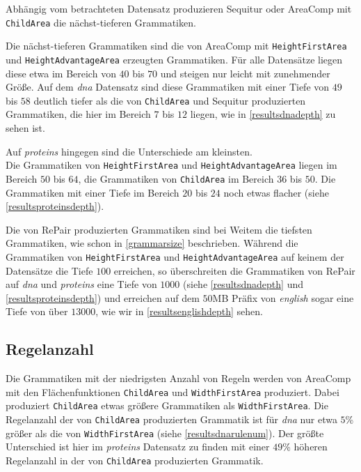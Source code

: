 Abhängig vom betrachteten Datensatz produzieren Sequitur oder AreaComp mit \\
\texttt{ChildArea} die nächst-tieferen Grammatiken. 

Die nächst-tieferen Grammatiken sind die von AreaComp mit 
\texttt{HeightFirstArea} und \texttt{HeightAdvantageArea} erzeugten Grammatiken. Für alle Datensätze liegen diese etwa im Bereich von $40$ bis $70$ und steigen nur leicht mit zunehmender Größe.
Auf dem \emph{dna} Datensatz sind diese Grammatiken mit einer Tiefe von $49$ bis $58$ deutlich tiefer als die von \texttt{ChildArea} und Sequitur produzierten Grammatiken, die hier im Bereich $7$ bis $12$ liegen, wie in \autoref{resultsdnadepth} zu sehen ist.

Auf \emph{proteins} hingegen sind die Unterschiede am kleinsten.\\
Die Grammatiken von \texttt{HeightFirstArea} und \texttt{HeightAdvantageArea} liegen im Bereich $50$ bis $64$, die Grammatiken von \texttt{ChildArea} im Bereich $36$ bis $50$. Die Grammatiken mit einer Tiefe im Bereich $20$ bis $24$ noch etwas flacher (siehe \autoref{resultsproteinsdepth}). 

Die von RePair produzierten Grammatiken sind bei Weitem die tiefsten Grammatiken, wie schon in \autoref{grammarsize} beschrieben. Während die Grammatiken von \texttt{HeightFirstArea} und \texttt{HeightAdvantageArea} auf keinem der Datensätze die Tiefe $100$ erreichen, so überschreiten die Grammatiken von RePair auf \emph{dna} und \emph{proteins} eine Tiefe von $1000$ (siehe \autoref{resultsdnadepth} und \autoref{resultsproteinsdepth}) und erreichen auf dem $50$MB Präfix von \emph{english} sogar eine Tiefe von über $13000$, wie wir in \autoref{resultsenglishdepth} sehen.

\subsection{Regelanzahl}

Die Grammatiken mit der niedrigsten Anzahl von Regeln werden von AreaComp mit den Flächenfunktionen \texttt{ChildArea} und \texttt{WidthFirstArea} produziert. Dabei produziert \texttt{ChildArea} etwas größere Grammatiken als \texttt{WidthFirstArea}. Die Regelanzahl der von \texttt{ChildArea} produzierten Grammatik ist für \emph{dna} nur etwa $5$\% größer als die von \texttt{WidthFirstArea} (siehe \autoref{resultsdnarulenum}). 
Der größte Unterschied ist hier im \emph{proteins} Datensatz zu finden mit einer $49$\% höheren Regelanzahl in der von \texttt{ChildArea} produzierten Grammatik. 

